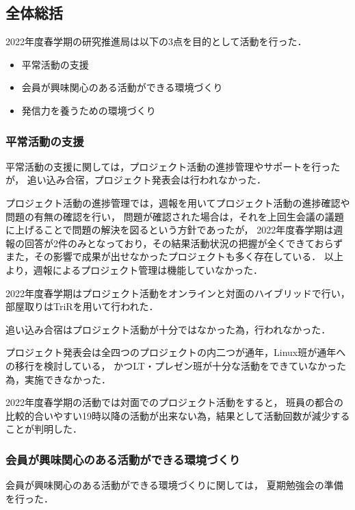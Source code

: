\subsection*{全体総括}


2022年度春学期の研究推進局は以下の3点を目的として活動を行った．

\begin{itemize}
    \item 平常活動の支援
    \item 会員が興味関心のある活動ができる環境づくり
    \item 発信力を養うための環境づくり
\end{itemize}

\subsubsection*{平常活動の支援}
平常活動の支援に関しては，プロジェクト活動の進捗管理やサポートを行ったが，
追い込み合宿，プロジェクト発表会は行われなかった．

プロジェクト活動の進捗管理では，週報を用いてプロジェクト活動の進捗確認や問題の有無の確認を行い，
問題が確認された場合は，それを上回生会議の議題に上げることで問題の解決を図るという方針であったが，
2022年度春学期は週報の回答が2件のみとなっており，その結果活動状況の把握が全くできておらず
また，その影響で成果が出せなかったプロジェクトも多く存在している．
以上より，週報によるプロジェクト管理は機能していなかった．

2022年度春学期はプロジェクト活動をオンラインと対面のハイブリッドで行い，
部屋取りはTriRを用いて行われた．

追い込み合宿はプロジェクト活動が十分ではなかった為，行われなかった．

プロジェクト発表会は全四つのプロジェクトの内二つが通年，Linux班が通年への移行を検討している，
かつLT・プレゼン班が十分な活動をできていなかった為，実施できなかった．

2022年度春学期の活動では対面でのプロジェクト活動をすると，
班員の都合の比較的合いやすい19時以降の活動が出来ない為，結果として活動回数が減少することが判明した．

\subsubsection*{会員が興味関心のある活動ができる環境づくり}
会員が興味関心のある活動ができる環境づくりに関しては，
夏期勉強会の準備を行った．

